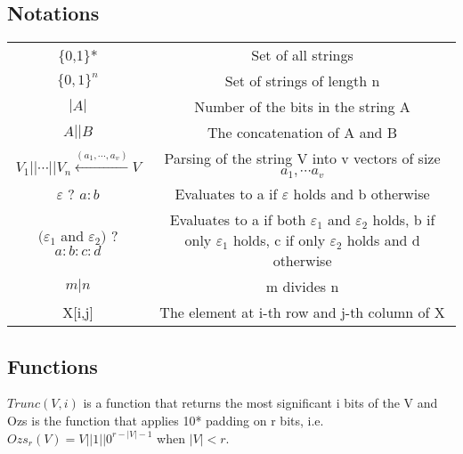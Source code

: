 \documentclass{article}
\begin{document}
\subsection{Notations}
\begin{center}
	\begin{tabular}{ |c|c| } 
		\hline
		\{0,1\}* & Set of all strings  \\
		$\{0,1\}^n$ & Set of strings of length n  \\ 
		$|A|$ &  Number of the bits in the string A \\ 
		$A||B$ & The concatenation of A and B\\
		$V_1||\cdots ||V_n \xleftarrow{(a_1,\cdots,a_v)} V$ & Parsing of the string
		V into v vectors of size $a_1,\cdots a_v$ \\
		$ \varepsilon$ ? $a : b$ & Evaluates
		to a if $ \varepsilon$ holds and b otherwise\\
		$ (\varepsilon_1$ and $ \varepsilon_2)$ ? $a : b : c : d$ & Evaluates to a if both $ \varepsilon_1$ and $ \varepsilon_2$ holds, b if
		only $ \varepsilon_1$ holds, c if only $ \varepsilon_2$ holds and d otherwise\\
		$m|n$ & m divides n\\
		X[i,j] & The element at i-th row and j-th column of X\\
		\hline
	\end{tabular}
\end{center}
\subsection{Functions}
$Trunc(V,i)$ is a function that returns the most significant i
bits of the V and Ozs is the function that applies 10* padding on r bits, i.e.
$Ozs_r(V) = V||1||0^{r-|V|-1}$ when $|V|< r.$\\\\
\end{document}
